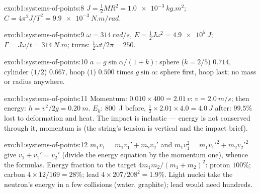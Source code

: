 \begin{solution}{exo:b1:systems-of-points:8}
$J = \tfrac12 MR^2 = \qty{1.0e-3}{kg.m^2}$; $C = 4\pi^2J/T^2 = \qty{9.9e-3}{N.m/rad}$.
\end{solution}

\begin{solution}{exo:b1:systems-of-points:9}
$\omega = \qty{314}{rad/s}$, $E = \tfrac12 J\omega^2 = \qty{4.9e5}{J}$;
$\Gamma = J\omega/t = \qty{314}{N.m}$; turns: $\tfrac12\omega t/2\pi = 250$.
\end{solution}

\begin{solution}{exo:b1:systems-of-points:10}
$a = g\sin\alpha/(1 + k)$: sphere ($k = 2/5$) $0.714$, cylinder ($1/2$)
$0.667$, hoop ($1$) $0.500$ times $g\sin\alpha$: sphere first, hoop last;
no mass or radius anywhere.
\end{solution}

\begin{solution}{exo:b1:systems-of-points:11}
Momentum: $0.010 \times 400 = 2.01\,v$: $v = \qty{2.0}{m/s}$; then energy:
$h = v^2/2g = \qty{0.20}{m}$. $E_k$: \qty{800}{J} before, $\tfrac12 \times
2.01 \times 4.0 = \qty{4.0}{J}$ after: $99.5\%$ lost to deformation and
heat. The impact is inelastic --- energy is not conserved through it,
momentum is (the string's tension is vertical and the impact brief).
\end{solution}

\begin{solution}{exo:b1:systems-of-points:12}
$m_1v_1 = m_1v_1' + m_2v_2'$ and $m_1v_1^2 = m_1v_1'^2 + m_2v_2'^2$ give
$v_1 + v_1' = v_2'$ (divide the energy equation by the momentum one),
whence the formulas. Energy fraction to the target $4m_1m_2/(m_1 + m_2)^2$:
proton $100\%$; carbon $4 \times 12/169 = 28\%$; lead $4 \times 207/208^2 =
1.9\%$. Light nuclei take the neutron's energy in a few collisions
(water, graphite); lead would need hundreds.
\end{solution}

